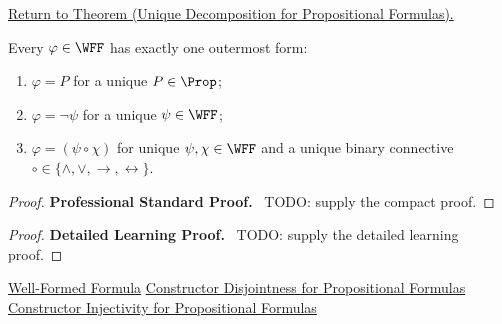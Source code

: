 \newpage
{}
\label{prf:unique-decomposition-propositional-formulas}

\begin{remark*}[Return]
\hyperref[thm:unique-decomposition-propositional-formulas]{Return to Theorem (Unique Decomposition for Propositional Formulas).}
\end{remark*}

\begin{theorem*}
Every \(\varphi\in\WFF\) has exactly one outermost form:
\begin{enumerate}
\item \(\varphi=P\) for a unique \(P\in\Prop\);
\item \(\varphi=\neg\psi\) for a unique \(\psi\in\WFF\);
\item \(\varphi=(\psi\circ\chi)\) for unique \(\psi,\chi\in\WFF\) and a unique binary connective \(\circ\in\{\land,\lor,\to,\leftrightarrow\}\).
\end{enumerate}
\end{theorem*}

\begin{proof}
\textbf{Professional Standard Proof.}~
TODO: supply the compact proof.
\end{proof}

\begin{proof}
\textbf{Detailed Learning Proof.}~
TODO: supply the detailed learning proof.
\end{proof}

\begin{remark*}
\end{remark*}

\begin{dependencies}
\hyperref[def:well-formed-formula]{Well-Formed Formula}
\hyperref[lem:constructor-disjointness-propositional-formulas]{Constructor Disjointness for Propositional Formulas}
\hyperref[lem:constructor-injectivity-propositional-formulas]{Constructor Injectivity for Propositional Formulas}
\end{dependencies}

\clearpage
